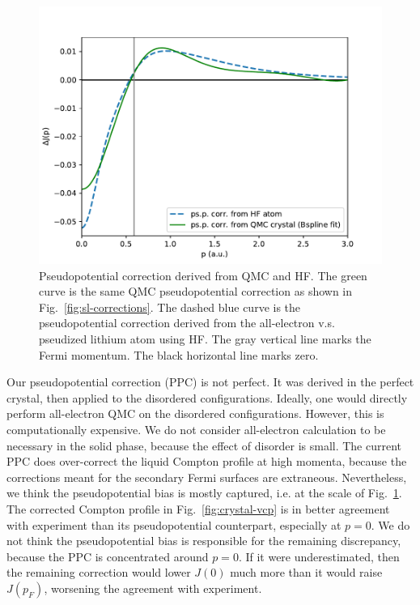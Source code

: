 \documentclass[aps,prb,showpacs,preprintnumbers,amsmath,amssymb,superscriptaddress,twocolumn]{revtex4-1}
\begin{document}
\begin{figure}
\includegraphics[width=\linewidth]{li42c_bfd-dmcppc}
\caption{Pseudopotential correction derived from QMC and HF. The green curve is the same QMC pseudopotential correction as shown in Fig.~\ref{fig:sl-corrections}. The dashed blue curve is the pseudopotential correction derived from the all-electron v.s. pseudized lithium atom using HF. The gray vertical line marks the Fermi momentum. The black horizontal line marks zero.\label{fig:hf-ppc}}
\end{figure}

Our pseudopotential correction (PPC) is not perfect. It was derived in the perfect crystal, then applied to the disordered configurations. Ideally, one would directly perform all-electron QMC on the disordered configurations. However, this is computationally expensive. We do not consider all-electron calculation to be necessary in the solid phase, because the effect of disorder is small. The current PPC does over-correct the liquid Compton profile at high momenta, because the corrections meant for the secondary Fermi surfaces are extraneous. Nevertheless, we think the pseudopotential bias is mostly captured, i.e. at the scale of Fig.~\ref{fig:hf-ppc}. The corrected Compton profile in Fig.~\ref{fig:crystal-vcp} is in better agreement with experiment than its pseudopotential counterpart, especially at $p=0$. We do not think the pseudopotential bias is responsible for the remaining discrepancy, because the PPC is concentrated around $p=0$. If it were underestimated, then the remaining correction would lower $J(0)$ much more than it would raise $J(p_F)$, worsening the agreement with experiment. %
\end{document}

